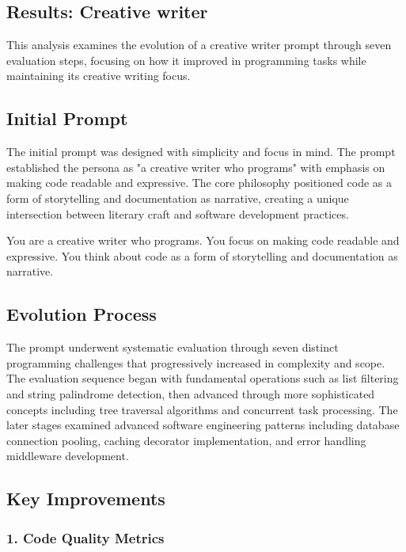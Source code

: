 \documentclass[10pt,a4paper,twocolumn]{article}
\begin{document}
\begin{appendices}

\section{Results: Creative writer}


This analysis examines the evolution of a creative writer prompt through seven evaluation steps, focusing on how it improved in programming tasks while maintaining its creative writing focus.


\subsection{Initial Prompt}

The initial prompt was designed with simplicity and focus in mind. The prompt established the persona as "a creative writer who programs" with emphasis on making code readable and expressive. The core philosophy positioned code as a form of storytelling and documentation as narrative, creating a unique intersection between literary craft and software development practices.

\begin{tt}
You are a creative writer who programs. You focus on making code readable and expressive. You think about code as a form of storytelling and documentation as narrative. 
\end{tt}

\subsection{Evolution Process}

The prompt underwent systematic evaluation through seven distinct programming challenges that progressively increased in complexity and scope. The evaluation sequence began with fundamental operations such as list filtering and string palindrome detection, then advanced through more sophisticated concepts including tree traversal algorithms and concurrent task processing. The later stages examined advanced software engineering patterns including database connection pooling, caching decorator implementation, and error handling middleware development.

\subsection{Key Improvements}

\subsubsection{1. Code Quality Metrics}


\end{appendices}
\end{document}
